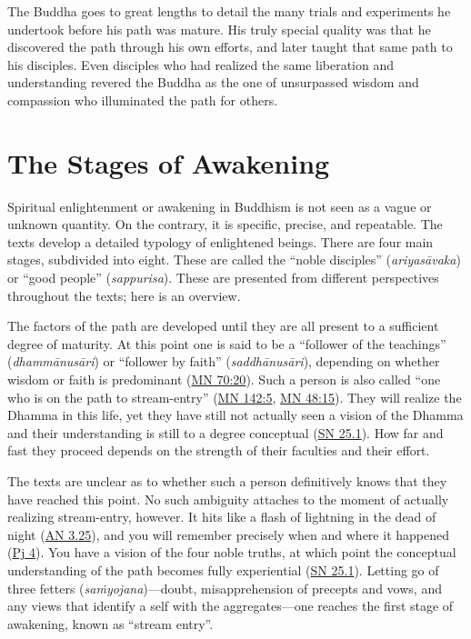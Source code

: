 \documentclass[12pt,openany]{book}%
\begin{document}
The Buddha goes to great lengths to detail the many trials and experiments he undertook before his path was mature. His truly special quality was that he discovered the path through his own efforts, and later taught that same path to his disciples. Even disciples who had realized the same liberation and understanding revered the Buddha as the one of unsurpassed wisdom and compassion who illuminated the path for others.

\section*{The Stages of Awakening}

Spiritual enlightenment or awakening in Buddhism is not seen as a vague or unknown quantity. On the contrary, it is specific, precise, and repeatable. The texts develop a detailed typology of enlightened beings. There are four main stages, subdivided into eight. These are called the “noble disciples” (\textit{\textsanskrit{ariyasāvaka}}) or “good people” (\textit{sappurisa}). These are presented from different perspectives throughout the texts; here is an overview.

The factors of the path are developed until they are all present to a sufficient degree of maturity. At this point one is said to be a “follower of the teachings” (\textit{\textsanskrit{dhammānusāri}}) or “follower by faith” (\textit{\textsanskrit{saddhānusāri}}), depending on whether wisdom or faith is predominant (\href{https://suttacentral.net/mn70\#20}{MN 70:20}). Such a person is also called “one who is on the path to stream-entry” (\href{https://suttacentral.net/mn142\#5}{MN 142:5}, \href{https://suttacentral.net/mn48\#15}{MN 48:15}). They will realize the Dhamma in this life, yet they have still not actually seen a vision of the Dhamma and their understanding is still to a degree conceptual (\href{https://suttacentral.net/sn25.1}{SN 25.1}). How far and fast they proceed depends on the strength of their faculties and their effort.

The texts are unclear as to whether such a person definitively knows that they have reached this point. No such ambiguity attaches to the moment of actually realizing stream-entry, however. It hits like a flash of lightning in the dead of night (\href{https://suttacentral.net/an3.25}{AN 3.25}), and you will remember precisely when and where it happened (\href{https://suttacentral.net/pj4}{Pj 4}). You have a vision of the four noble truths, at which point the conceptual understanding of the path becomes fully experiential (\href{https://suttacentral.net/sn25.1}{SN 25.1}). Letting go of three fetters (\textit{\textsanskrit{saṁyojana}})—doubt, misapprehension of precepts and vows, and any views that identify a self with the aggregates—one reaches the first stage of awakening, known as “stream entry”.
\end{document}
